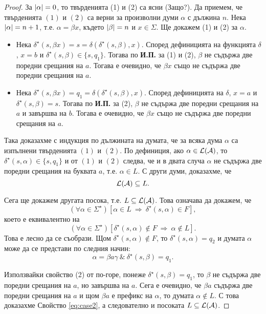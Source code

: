 \begin{proof}
 За $\lvert{\alpha}\rvert = 0$, то твърденията (1) и (2) са ясни (Защо?).
 Да приемем, че твърденията $(1)$ и $(2)$ са верни за произволни думи $\alpha$ с дължина $n$.
 Нека $\lvert{\alpha}\rvert = n+1$, т.е. $\alpha = \beta x$, където $\lvert{\beta}\rvert = n$ и $x \in \Sigma$.
 Ще докажем (1) и (2) за $\alpha$.
 \begin{itemize}[-]
 \item 
   Нека $\delta^\star(s,\beta x) = s = \delta(\delta^\star(s,\beta),x)$.
   Според дефиницията на функцията $\delta$, $x = b$ и $\delta^\star(s,\beta) \in \{s,q_1\}$.
   Тогава по {\bf И.П.} за (1) и (2), $\beta$ не съдържа две поредни срещания на $a$.
   Тогава е очевидно, че $\beta x$ също не съдържа две поредни срещания на $a$.
 \item
   Нека $\delta^\star(s,\beta x) = q_1 = \delta(\delta^\star(s,\beta),x)$.
   Според дефиницията на $\delta$, $x = a$ и $\delta^\star(s,\beta) = s$.
   Тогава по {\bf И.П.} за (2), $\beta$ не съдържа две поредни срещания на $a$
   и завършва на $b$.
   Тогава е очевидно, че $\beta x$ също не съдържа две поредни срещания на $a$.
 \end{itemize}
 
 Така доказахме с индукция по дължината на думата, че за всяка дума $\alpha$
 са  изпълнени твърденията $(1)$ и $(2)$. По дефиниция, ако $\alpha \in \mathcal{L}(\mathcal{A})$,
 то $\delta^\star(s,\alpha) \in \{s,q_1\}$ и от $(1)$ и $(2)$ следва, че и в двата случа
 $\alpha$ не съдържа две поредни срещания на буквата $a$, т.е. $\alpha \in L$.
 С други думи, доказахме, че 
 \[\mathcal{L}(\mathcal{A}) \subseteq L.\]

 Сега ще докажем другата посока, т.е. $L \subseteq \mathcal{L}(\mathcal{A})$.
 Това означава да докажем, че
 \[(\forall \alpha \in \Sigma^\star)[\alpha \in L\ \Rightarrow\ \delta^\star(s,\alpha) \in F],\]
 което е еквивалентно на
 \begin{equation}
   \label{eq:case2}
   (\forall \alpha \in \Sigma^\star)[\delta^\star(s,\alpha) \not\in F \ \Rightarrow\ \alpha\not\in L].
 \end{equation}
 Това е лесно да се съобрази.
 Щом $\delta^\star(s,\alpha) \not\in F$, то 
 $\delta^\star(s,\alpha) = q_2$ и думата $\alpha$ може да се представи по следния начин:
 \[\alpha = \beta a \gamma\ \&\ \delta^\star(s,\beta) = q_1.\]
 
 Използвайки свойство (2) от по-горе, понеже $\delta^\star(s,\beta) = q_1$, то
 $\beta$ не съдържа две поредни срещания на $a$, но завършва на $a$.
 Сега е очевидно, че $\beta a$ съдържа две поредни срещания на $a$ и 
 щом $\beta a$ е префикс на $\alpha$, то думата $\alpha \not\in L$.
 С това доказахме Свойство \ref{eq:case2}, а следователно и посоката $L\subseteq \mathcal{L}(\mathcal{A})$.
\end{proof}

